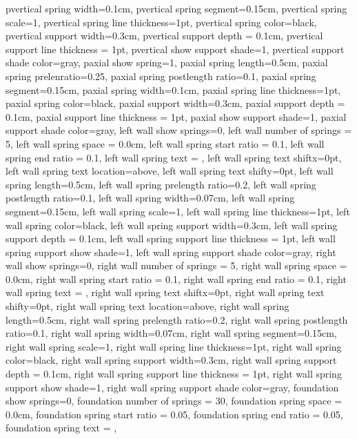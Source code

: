 {{  pvertical spring width=0.1cm,
  pvertical spring segment=0.15cm,
  pvertical spring scale=1,
  pvertical spring line thickness=1pt,
  pvertical spring color=black,
  pvertical support width=0.3cm,
  pvertical support depth = 0.1cm,
  pvertical support line thickness = 1pt,
  pvertical show support shade=1,
  pvertical support shade color=gray,
  paxial show spring=1,
  paxial spring length=0.5cm,
  paxial spring prelenratio=0.25,
  paxial spring postlength ratio=0.1,
  paxial spring segment=0.15cm,
  paxial spring width=0.1cm,
  paxial spring line thickness=1pt,
  paxial spring color=black,
  paxial support width=0.3cm,
  paxial support depth = 0.1cm,
  paxial support line thickness = 1pt,
  paxial show support shade=1,
  paxial support shade color=gray,
  left wall show springs=0,
  left wall number of springs = 5,
  left wall spring space = 0.0cm,
  left wall spring start ratio = 0.1,
  left wall spring end ratio = 0.1,
  left wall spring text = {},
  left wall spring text shiftx=0pt,
  left wall spring text location=above,
  left wall spring text shifty=0pt,
  left wall spring length=0.5cm,
  left wall spring prelength ratio=0.2,
  left wall spring postlength ratio=0.1,
  left wall spring width=0.07cm,
  left wall spring segment=0.15cm,
  left wall spring scale=1,
  left wall spring line thickness=1pt,
  left wall spring color=black,
  left wall spring support width=0.3cm,
  left wall spring support depth = 0.1cm,
  left wall spring support line thickness = 1pt,
  left wall spring support show shade=1,
  left wall spring support shade color=gray,
  right wall show springs=0,
  right wall number of springs = 5,
  right wall spring space = 0.0cm,
  right wall spring start ratio = 0.1,
  right wall spring end ratio = 0.1,
  right wall spring text = {},
  right wall spring text shiftx=0pt,
  right wall spring text shifty=0pt,
  right wall spring text location=above,
  right wall spring length=0.5cm,
  right wall spring prelength ratio=0.2,
  right wall spring postlength ratio=0.1,
  right wall spring width=0.07cm,
  right wall spring segment=0.15cm,
  right wall spring scale=1,
  right wall spring line thickness=1pt,
  right wall spring color=black,
  right wall spring support width=0.3cm,
  right wall spring support depth = 0.1cm,
  right wall spring support line thickness = 1pt,
  right wall spring support show shade=1,
  right wall spring support shade color=gray,
  foundation show springs=0,
  foundation number of springs = 30,
  foundation spring space = 0.0cm,
  foundation spring start ratio = 0.05,
  foundation spring end ratio = 0.05,
  foundation spring text = {},
}}
